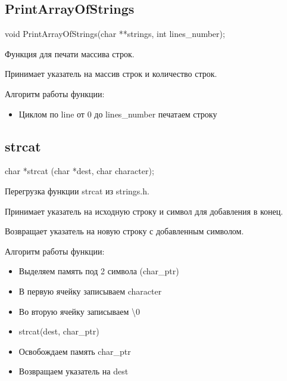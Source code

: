 \subsection*{PrintArrayOfStrings}
void PrintArrayOfStrings(char **strings, int lines\_number);

Функция для печати массива строк.

Принимает указатель на массив строк и количество строк.

Алгоритм работы функции:

\begin{itemize}
	\item Циклом по line от 0 до lines\_number печатаем строку
\end{itemize}

\subsection*{strcat}
char *strcat (char *dest, char character);

Перегрузка функции strcat из strings.h.

Принимает указатель на исходную строку и символ для добавления в конец.

Возвращает указатель на новую строку с добавленным символом.

Алгоритм работы функции:

\begin{itemize}
	\item Выделяем память под 2 символа (char\_ptr)
	\item В первую ячейку записываем character
	\item Во вторую ячейку записываем \textbackslash 0
	\item strcat(dest, char\_ptr)
	\item Освобождаем память char\_ptr
	\item Возвращаем указатель на dest
\end{itemize}
